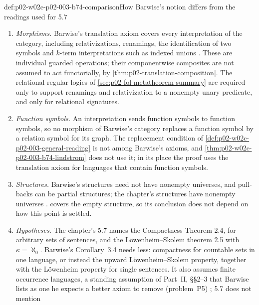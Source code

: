 \begin{hbwarning}{def:p02-w02c-p02-003-b74-comparison}{How Barwise's notion differs from the readings used for 5.7}
\begin{enumerate}
\item \emph{Morphisms.}  Barwise's translation axiom covers every
      interpretation of the category, including relativizations,
      renamings, the identification of two symbols and \(k\)-term
      interpretations such as indexed unions
      \cite[Part~I, \S5, 5.2--5.4, pp.~231--232]{Barwise1974Axioms}.
      These are individual guarded operations; their componentwise
      composites are not assumed to act functorially, by
      \cref{thm:p02-translation-composition}.  The
      relational regular logics of \cref{sec:p02-fol-metatheorem-summary}
      are required only to support renamings and relativization to a
      nonempty unary predicate, and only for relational signatures.
\item \emph{Function symbols.}  An interpretation sends function symbols
      to function symbols, so no morphism of Barwise's category replaces a
      function symbol by a relation symbol for its graph.  The replacement
      condition of \cref{def:p02-w02c-p02-003-general-reading} is not among
      Barwise's axioms, and \cref{thm:p02-w02c-p02-003-b74-lindstrom} does
      not use it; in its place the proof uses the translation axiom for
      languages that contain function symbols.
\item \emph{Structures.}  Barwise's structures need not have nonempty
      universes, and pull-backs can be partial structures; the chapter's
      structures have nonempty universes
      \cite[ch.~A.1, \S3, 3.1, p.~17]{Barwise1977FirstOrder}.
       covers the empty structure,
      so its conclusion does not depend on how this point is settled.
\item \emph{Hypotheses.}  The chapter's 5.7 names the Compactness Theorem
      2.4, for arbitrary sets of sentences, and the L\"owenheim--Skolem
      theorem 2.5 with \(\kappa=\aleph_0\).  Barwise's Corollary~3.4 needs
      less: compactness for countable sets in one language, or instead the
      upward L\"owenheim--Skolem property, together with the L\"owenheim
      property for single sentences.  It also assumes finite occurrence
      languages, a standing assumption of Part~II, \S\S2--3 that Barwise
      lists as one he expects a better axiom to remove (problem~P5)
      \cite[Part~II, \S5, p.~264]{Barwise1974Axioms}; 5.7 does not mention

\end{enumerate}
\end{hbwarning}
